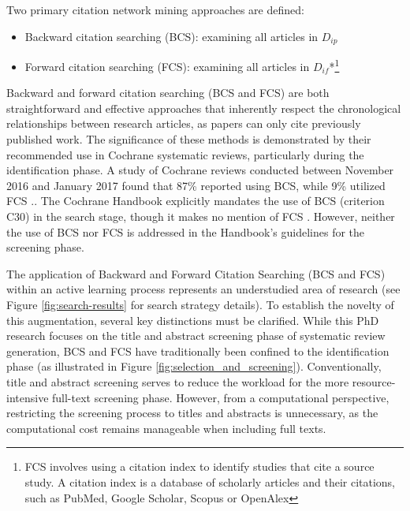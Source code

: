 \documentclass[10pt, english]{article}
\begin{document}
Two primary citation network mining approaches are defined:
\begin{itemize}
    \item Backward citation searching (BCS): examining all articles in $D_{ip}$\cite{lefebvre2011cochrane, akers2009systematic}
    \item Forward citation searching (FCS): examining all articles in $D_{if}$*\footnote{FCS involves using a citation index to identify studies that cite a source study. A citation index is a database of scholarly articles and their citations, such as PubMed, Google Scholar, Scopus or OpenAlex}
\end{itemize}

Backward and forward citation searching (BCS and FCS) are both straightforward and effective approaches that inherently respect the chronological relationships between research articles, as papers can only cite previously published work. The significance of these methods is demonstrated by their recommended use in Cochrane systematic reviews, particularly during the identification phase. A study of Cochrane reviews conducted between November 2016 and January 2017 found that 87\% reported using BCS, while 9\% utilized FCS \cite{briscoeConductReportingCitation2019}.. The Cochrane Handbook explicitly mandates the use of BCS (criterion C30) in the search stage, though it makes no mention of FCS  \cite{MECIRManualCochrane}. However, neither the use of BCS nor FCS is addressed in the Handbook's guidelines for the screening phase.


The application of Backward and Forward Citation Searching (BCS and FCS) within an active learning process represents an understudied area of research (see Figure \ref{fig:search-results} for search strategy details). To establish the novelty of this augmentation, several key distinctions must be clarified. While this PhD research focuses on the title and abstract screening phase of systematic review generation, BCS and FCS have traditionally been confined to the identification phase (as illustrated in Figure \ref{fig:selection_and_screening}). Conventionally, title and abstract screening serves to reduce the workload for the more resource-intensive full-text screening phase. However, from a computational perspective, restricting the screening process to titles and abstracts is unnecessary, as the computational cost remains manageable when including full texts.
 
\end{document}
